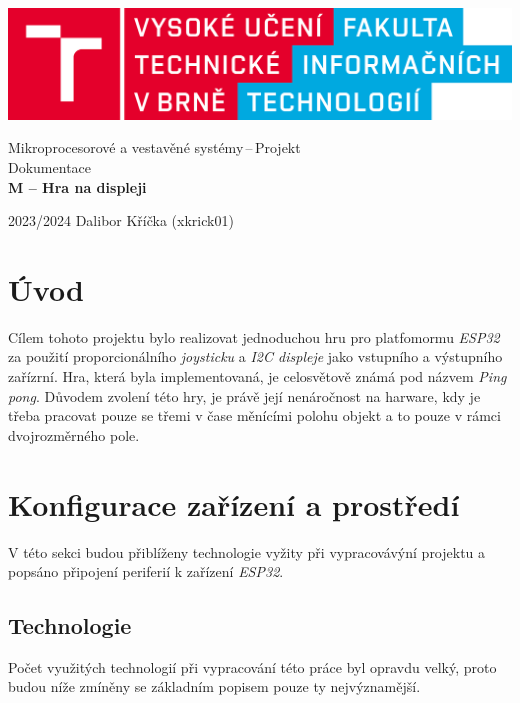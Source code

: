 \documentclass[a4paper, 11pt]{article}
\begin{document}

\begin{titlepage}
    \begin{center}{}

        \centerline{\includegraphics[scale=0.12]{img/fit_logo.png}}

        {\Huge Mikroprocesorové a vestavěné systémy\,--\,Projekt} \\[1em]
        {\huge Dokumentace}
        \\[0.6em]
        \textbf{\LARGE M -- Hra na displeji }

    \end{center}

    {\Large 2023/2024 \hfill Dalibor Kříčka (xkrick01)}
\end{titlepage}


\tableofcontents

\newpage
\section{Úvod}
Cílem tohoto projektu bylo realizovat jednoduchou hru pro platfomormu \emph{ESP32} za použití proporcionálního
\emph{joysticku} a \emph{I2C displeje} jako vstupního a výstupního zařízrní. Hra, která byla implementovaná, je
celosvětově známá pod názvem \emph{Ping pong}. Důvodem zvolení této hry, je právě její nenáročnost na harware,
kdy je třeba pracovat pouze se třemi v čase měnícími polohu objekt a to pouze v rámci dvojrozměrného pole.


\section{Konfigurace zařízení a prostředí}
V této sekci budou přiblíženy technologie vyžity při vypracovávýní projektu a popsáno připojení periferií k zařízení \emph{ESP32}.

\subsection{Technologie}
Počet využitých technologií při vypracování této práce byl opravdu velký, proto budou níže zmíněny se základním popisem pouze
ty nejvýznamější.
\end{document}
